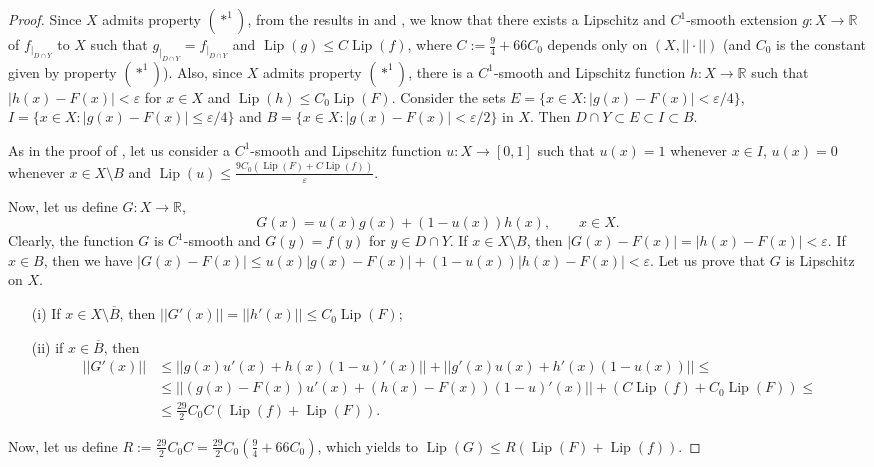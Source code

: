 \documentclass[11pt]{amsart}
\numberwithin{equation}{section}
\begin{document}
\begin{proof}
Since $X$ admits property $(*^1)$, from the results in \cite{Azafrykeener} and \cite{MarLuis}, we know that there exists a Lipschitz and $C^1$-smooth extension $g:X\to{\mathbb{R}}$ of
$f_{\mid_{D\cap Y}}$ to $X$ such that $g_{\mid_{D\cap Y}}=f_{\mid_{D\cap Y}}$ and ${\operatorname{Lip}}(g)\le C{\operatorname{Lip}}(f)$, where  $C:= \frac{9}{4}+66C_0$
depends only on $(X, ||\cdot||)$ (and $C_0$ is the constant given by property $(*^1)$). Also, since $X$ admits  property $(*^1)$, there is a $C^1$-smooth and Lipschitz function $h:X\to{\mathbb{R}}$ such that $|h(x)-F(x)|<\varepsilon$ for $x\in X$ and ${\operatorname{Lip}}(h)\le C_0 {\operatorname{Lip}}(F)$. Consider the sets $E=\{x\in X: |g(x)-F(x)|<\varepsilon/4\}$, $I=\{x\in X: |g(x)-F(x)|\le \varepsilon/4\}$ and $B=\{x\in X: |g(x)-F(x)|<\varepsilon/2\}$  in $X$. Then $D\cap Y\subset E\subset I \subset B$.

As in the proof of \cite[Lemma 2.3]{MarLuis}, let us consider a $C^1$-smooth and Lipschitz function $u:X\to[0,1]$ such that $u(x)=1$ whenever $x\in I$, $u(x)=0$ whenever $x\in X\setminus B$ and ${\operatorname{Lip}}(u)\le \frac{9C_0({\operatorname{Lip}}(F)+C{\operatorname{Lip}}(f))}{\varepsilon}$.

Now, let us define $G:X\rightarrow \mathbb R$,
\begin{equation*}
G(x)=u(x)g(x)+(1-u(x))h(x),  \qquad  x\in X.
\end{equation*}
 Clearly, the function $G$ is  $C^1$-smooth and $G(y)=f(y)$ for $y\in D\cap Y$. If  $x\in X\setminus B$, then
 $|G(x)-F(x)|=|h(x)-F(x)|<\varepsilon$. If $x\in B$, then we have  $|G(x)-F(x)|\le u(x)|g(x)-F(x)|+(1-u(x))|h(x)-F(x)|<\varepsilon$.
Let us prove that $G$ is Lipschitz on $X$.
\begin{itemize}
\item[(i)] If $x\in X\setminus \overline{B}$, then $||G'(x)||=||h'(x)||\le C_0 {\operatorname{Lip}}(F)$;
\item[(ii)] if $x\in \overline{B}$, then
\begin{align*}
||G'(x)||&\le ||g(x)u'(x)+h(x)(1-u)'(x)||+||g'(x)u(x)+h'(x)(1-u(x))||\le \\
&\le ||(g(x)-F(x))u'(x)+(h(x)-F(x))(1-u)'(x)||+ (C{\operatorname{Lip}}(f)+C_0{\operatorname{Lip}}(F))\le \\
&\le  \frac{29}{2}C_0C({\operatorname{Lip}}(f)+{\operatorname{Lip}}(F)).
\end{align*}
\end{itemize}
Now, let us define $R:=\frac{29}{2}C_0C=\frac{29}{2}C_0(\frac{9}{4}+66C_0)$, which yields to ${\operatorname{Lip}}(G)\le R({\operatorname{Lip}}(F)+{\operatorname{Lip}}(f))$.

\end{proof}
\end{document}
